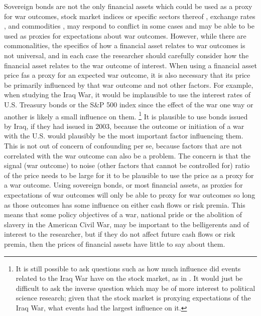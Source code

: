 Sovereign bonds are not the only financial assets which could be used as a proxy for war outcomes, stock market indices or specific sectors thereof \textcites{ChenSiems2004}{SchneiderTroeger2006}{WolfersZitzewitz2009}, exchange rates \textcites{Hall2004}, and commodities \textcites{WolfersZitzewitz2009}, may respond to conflict in some cases and may be able to be used as proxies for expectations about war outcomes.
However, while there are commonalities, the specifics of how a financial asset relates to war outcomes is not universal, and in each case the researcher should carefully consider how the financial asset relates to the war outcome of interest.
When using a financial asset price fas a proxy for an expected war outcome, it is also necessary that its price be primarily influenced by that war outcome and not other factors.
For example, when studying the Iraq War, it would be implausible to use the interest rates of U.S. Treasury bonds or the S\&P 500 index since the effect of the war one way or another is likely a small influence on them.%
\footnote{
  It is still possible to ask questions such as how much influence did events related to the Iraq War have on the stock market, as in .
  It would just be difficult to ask the inverse question which may be of more interest to political science research; given that the stock market is proxying expectations of the Iraq War, what events had the largest influence on it.
 }
It is plausible to use bonds issued by Iraq, if they had issued in 2003, because the outcome or initiation of a war with the U.S. would plausibly be the most important factor influencing them.
This is not out of concern of confounding per se, because factors that are not correlated with the war outcome can also be a problem.
The concern is that the signal (war outcome) to noise (other factors that cannot be controlled for) ratio of the price needs to be large for it to be plausible to use the price as a proxy for a war outcome.
Using sovereign bonds, or most financial assets, as proxies for expectations of war outcomes will only be able to proxy for war outcomes so long as those outcomes has some influence on either cash flows or risk premia.
This means that some policy objectives of a war, \eg{}national pride or the abolition of slavery in the American Civil War, may be important to the belligerents and of interest to the researcher, but if they do not affect future cash flows or risk premia, then the prices of financial assets have little to say about them.

